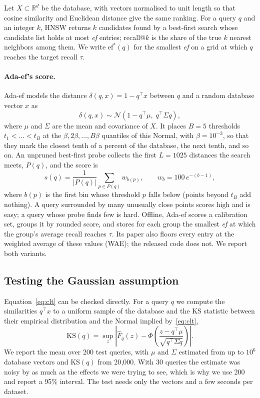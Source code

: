 \documentclass[sigconf,anonymous]{acmart}
\newcommand{\ef}{\textit{ef}}
\newcommand{\KS}{\mathrm{KS}}
\begin{document}
Let $X \subset \mathbb{R}^d$ be the database, with vectors normalised to unit length so that
cosine similarity and Euclidean distance give the same ranking. For a query $q$ and an integer $k$,
HNSW returns $k$ candidates found by a best-first search whose candidate list holds at most \ef{}
entries; recall@$k$ is the share of the true $k$ nearest neighbors among them. We write
$\mathrm{ef}^*(q)$ for the smallest \ef{} on a grid at which $q$ reaches the target recall $\tau$.

\paragraph{Ada-ef's score.}
Ada-ef models the distance $\delta(q,x) = 1 - q^\top x$ between $q$ and a random database vector
$x$ as
\begin{equation}
  \delta(q,x) \sim \mathcal{N}\!\left(1 - q^\top\mu,\; q^\top \Sigma q\right),
  \label{eq:clt}
\end{equation}
where $\mu$ and $\Sigma$ are the mean and covariance of $X$. It places $B = 5$ thresholds
$t_1 < \dots < t_B$ at the $\beta, 2\beta, \dots, B\beta$ quantiles of this Normal, with
$\beta = 10^{-3}$, so that they mark the closest tenth of a percent of the database, the next
tenth, and so on. An unpruned best-first probe collects the first $L = 1025$ distances the search
meets, $P(q)$, and the score is
\begin{equation}
  s(q) = \frac{1}{|P(q)|} \sum_{p \in P(q)} w_{b(p)}, \qquad w_b = 100\, e^{-(b-1)},
  \label{eq:score}
\end{equation}
where $b(p)$ is the first bin whose threshold $p$ falls below (points beyond $t_B$ add nothing). A
query surrounded by many unusually close points scores high and is easy; a query whose probe finds
few is hard. Offline, Ada-ef scores a calibration set, groups it by rounded score, and stores for
each group the smallest \ef{} at which the group's average recall reaches $\tau$. Its paper also
floors every entry at the weighted average of these values (WAE); the released code does not. We
report both variants.

\subsection{Testing the Gaussian assumption}

Equation~\eqref{eq:clt} can be checked directly. For a query $q$ we compute the similarities
$q^\top x$ to a uniform sample of the database and the KS statistic between their empirical
distribution and the Normal implied by~\eqref{eq:clt},
\begin{equation}
  \KS(q) = \sup_z \left| \hat F_q(z) - \Phi\!\left(\frac{z - q^\top\mu}{\sqrt{q^\top\Sigma q}}\right) \right| .
\end{equation}
We report the mean over 200 test queries, with $\mu$ and $\Sigma$ estimated from up to $10^6$
database vectors and $\KS(q)$ from 20{,}000. With 30 queries the estimate was noisy by as much as
the effects we were trying to see, which is why we use 200 and report a 95\% interval. The test
needs only the vectors and a few seconds per dataset.
\end{document}
